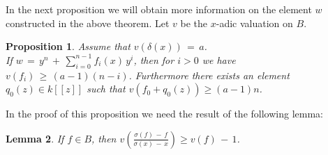\documentclass{amsart}
\numberwithin{equation}{section}
\newtheorem{lemma}{Lemma}[section]
\newtheorem{proposition}[lemma]{Proposition}
\theoremstyle{definition}
\theoremstyle{remark}
\begin{document}
In the next proposition we will obtain more information on the 
element $w$ constructed in the above theorem.
 Let $v$ be the $x$-adic valuation on $B$.
\begin{proposition} \label{ref-5.3-19}
    Assume that $v(\delta(x)) \,=\, a$.
    \\ If $w \,=\, y^{n} \,+\, \displaystyle{\sum_{i=0}^{n-1} 
    f_{i}(x)\,y^{i}}$, then for $i > 0$ we have $v(f_{i}) \,\geq\, 
    (a-1)(n-i)$. Furthermore there exists an element $q_0(z)\in
    k[[z]]$ such that $v(f_0+q_0(z))\ge (a-1)n$.
\end{proposition}

In the proof of this proposition we need the result of the following 
lemma:

\begin{lemma} \label{ref-5.4-20}
    If $f \in B$, then $\displaystyle{v \left( \frac{\sigma(f) \,-\, 
    f}{\sigma(x) \,-\, x} \right) \geq v(f) \,-\, 1}$.
\end{lemma}
\end{document}
